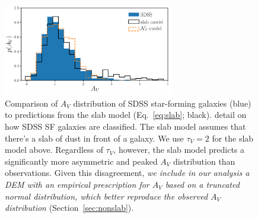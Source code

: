 \begin{figure}
    \begin{center}
        \includegraphics[width=0.66\textwidth]{figs/slab_tnorm.pdf} 
        \caption{Comparison of $A_V$ distribution of SDSS star-forming
        galaxies (blue) to predictions from the slab model (Eq.~\ref{eq:slab};
        black). {\color{red} detail on how SDSS SF galaxies are classified.} 
        The slab model assumes that there's a slab of dust in front of a galaxy.
        We use $\tau_V=2$ for the slab model above. Regardless of $\tau_V$,
        however, the slab model predicts a significantly more asymmetric and peaked $A_V$ distribution
        than observations. Given this disagreement, {\em we include in our
        analysis a DEM with an empirical prescription for $A_V$ based on a truncated normal 
        distribution, which better reproduce the observed $A_V$ distribution} (Section~\ref{sec:nonslab}). }
        \label{fig:av_dist}
    \end{center}
\end{figure}

